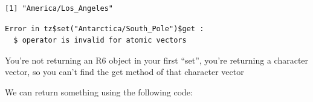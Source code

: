 \documentclass[]{book}
\newenvironment{Shaded}{\begin{snugshade}}{\end{snugshade}}
\newcommand{\KeywordTok}[1]{\textcolor[rgb]{0.13,0.29,0.53}{\textbf{#1}}}
\newcommand{\NormalTok}[1]{#1}
\newcommand{\OperatorTok}[1]{\textcolor[rgb]{0.81,0.36,0.00}{\textbf{#1}}}
\newcommand{\StringTok}[1]{\textcolor[rgb]{0.31,0.60,0.02}{#1}}
\begin{document}
\begin{verbatim}
[1] "America/Los_Angeles"
\end{verbatim}

\begin{Shaded}
\end{Shaded}

\begin{verbatim}
Error in tz$set("Antarctica/South_Pole")$get : 
  $ operator is invalid for atomic vectors
\end{verbatim}

You're not returning an R6 object in your first ``set'', you're returning a character vector, so you can't find the get method of that character vector

We can return something using the following code:
\end{document}
